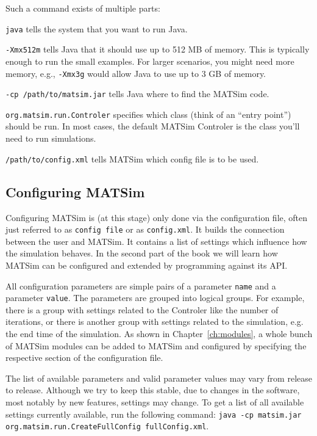 Such a command exists of multiple parts:
\begin{compactitem}
\item \lstinline|java| tells the system that you want to run Java.
\item \lstinline|-Xmx512m| tells Java that it should use up to 512 MB of memory. This is typically enough to run the small examples. For larger scenarios, you might need more memory, e.g., \lstinline|-Xmx3g| would allow Java to use up to 3 GB of memory.
\item \lstinline|-cp /path/to/matsim.jar| tells Java where to find the MATSim code.
\item \lstinline|org.matsim.run.Controler| specifies which class (think of an ``entry point'') should be run. In most cases, the default MATSim Controler is the class you'll need to run simulations.
\item \lstinline|/path/to/config.xml| tells MATSim which config file is to be used.
\end{compactitem}

\subsection{Configuring MATSim}
Configuring MATSim is (at this stage) only done via the configuration file, often just referred to as \lstinline|config file| or as \lstinline|config.xml|. It builds the connection between the user and MATSim. It contains a list of settings which influence how the simulation behaves. In the second part of the book we will learn how MATSim can be configured and extended by programming against its API.

All configuration parameters are simple pairs of a parameter \lstinline|name| and a parameter \lstinline|value|. The parameters are grouped into logical groups. For example, there is a group with settings related to the Controler like the number of iterations, or there is another group with settings related to the simulation, e.g. the end time of the simulation. As shown in Chapter~\ref{ch:modules}, a whole bunch of MATSim modules can be added to MATSim and configured by specifying the respective section of the configuration file.

The list of available parameters and valid parameter values may vary from release to release. Although we try to keep this stable, due to changes in the software, most notably by new features, settings may change. To get a list of all available settings currently available, run the following command: \lstinline|java -cp matsim.jar org.matsim.run.CreateFullConfig fullConfig.xml|.


